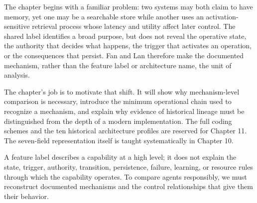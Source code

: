 The chapter begins with a familiar problem: two systems may both claim to have memory, yet one may be a searchable store while another uses an activation-sensitive retrieval process whose latency and utility affect later control. The shared label identifies a broad purpose, but does not reveal the operative state, the authority that decides what happens, the trigger that activates an operation, or the consequences that persist. Fan and Lan therefore make the documented mechanism, rather than the feature label or architecture name, the unit of analysis.

The chapter's job is to motivate that shift. It will show why mechanism-level comparison is necessary, introduce the minimum operational chain used to recognize a mechanism, and explain why evidence of historical lineage must be distinguished from the depth of a modern implementation. The full coding schemes and the ten historical architecture profiles are reserved for Chapter 11. The seven-field representation itself is taught systematically in Chapter 10.

\begin{takeawaybox}
A feature label describes a capability at a high level; it does not explain the state, trigger, authority, transition, persistence, failure, learning, or resource rules through which the capability operates. To compare agents responsibly, we must reconstruct documented mechanisms and the control relationships that give them their behavior.
\end{takeawaybox}

